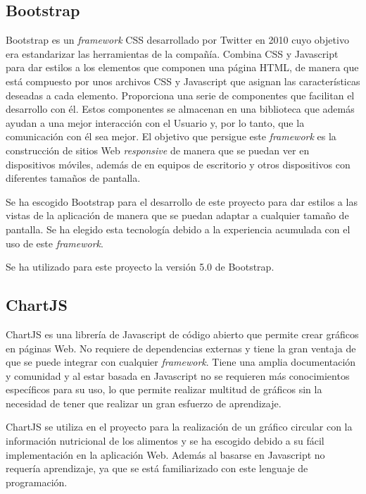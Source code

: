 \subsection{Bootstrap}
Bootstrap \cite{bootstrap} es un \textit{framework} CSS desarrollado por Twitter en 2010 cuyo objetivo era estandarizar las herramientas de la compañía. Combina CSS y Javascript para dar estilos a los elementos que componen una página HTML, de manera que está compuesto por unos archivos CSS y Javascript que asignan las características deseadas a cada elemento. Proporciona una serie de componentes que facilitan el desarrollo con él. Estos componentes se almacenan en una biblioteca que además ayudan a una mejor interacción con el Usuario y, por lo tanto, que la comunicación con él sea mejor.  El objetivo que persigue este \textit{framework} es la construcción de sitios Web \textit{responsive} de manera que se puedan ver en dispositivos móviles, además de en equipos de escritorio y otros dispositivos con diferentes tamaños de pantalla. 

Se ha escogido Bootstrap para el desarrollo de este proyecto para dar estilos a las vistas de la aplicación de manera que se puedan adaptar a cualquier tamaño de pantalla. Se ha elegido esta tecnología debido a la experiencia acumulada con el uso de este \textit{framework}.

Se ha utilizado para este proyecto la versión 5.0 de Bootstrap.



\subsection{ChartJS}
ChartJS \cite{chartJS} es una librería de Javascript de código abierto que permite crear gráficos en páginas Web. No requiere de dependencias externas y tiene la gran ventaja de que se puede integrar con cualquier \textit{framework}. Tiene una amplia documentación y comunidad y al estar basada en Javascript no se requieren más conocimientos específicos para su uso, lo que permite realizar multitud de gráficos sin la necesidad de tener que realizar un gran esfuerzo de aprendizaje. 

ChartJS se utiliza en el proyecto para la realización de un gráfico circular con la información nutricional de los alimentos y se ha escogido debido a su fácil implementación en la aplicación Web. Además al basarse en Javascript no requería aprendizaje, ya que se está familiarizado con este lenguaje de programación. 

